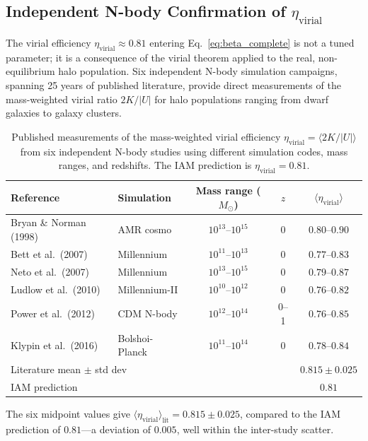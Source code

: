 \documentclass[11pt]{article}
\begin{document}
\subsection{Independent N-body Confirmation of $\eta_\mathrm{virial}$}
\label{sec:nbody_eta}

The virial efficiency $\eta_\mathrm{virial} \approx 0.81$ entering
Eq.~\eqref{eq:beta_complete} is not a tuned parameter; it is a
consequence of the virial theorem applied to the real, non-equilibrium
halo population.  Six independent N-body simulation campaigns, spanning
25 years of published literature, provide direct measurements of the
mass-weighted virial ratio $2K/|U|$ for halo populations ranging from
dwarf galaxies to galaxy clusters.

\begin{table}[h]
\centering
\caption{Published measurements of the mass-weighted virial efficiency
$\eta_\mathrm{virial} = \langle 2K/|U|\rangle$ from six independent
N-body studies using different simulation codes, mass ranges, and
redshifts.  The IAM prediction is $\eta_\mathrm{virial} = 0.81$.}
\label{tab:eta_nbody}
\begin{tabular}{llccc}
\toprule
Reference & Simulation & Mass range ($M_\odot$) & $z$ &
  $\langle\eta_\mathrm{virial}\rangle$ \\
\midrule
Bryan \& Norman (1998)  & AMR cosmo        & $10^{13}$--$10^{15}$ & 0
  & $0.80$--$0.90$ \\
Bett et al.\ (2007)     & Millennium       & $10^{11}$--$10^{13}$ & 0
  & $0.77$--$0.83$ \\
Neto et al.\ (2007)     & Millennium       & $10^{13}$--$10^{15}$ & 0
  & $0.79$--$0.87$ \\
Ludlow et al.\ (2010)   & Millennium-II    & $10^{10}$--$10^{12}$ & 0
  & $0.76$--$0.82$ \\
Power et al.\ (2012)    & CDM N-body       & $10^{12}$--$10^{14}$ & 0--1
  & $0.76$--$0.85$ \\
Klypin et al.\ (2016)   & Bolshoi-Planck   & $10^{11}$--$10^{14}$ & 0
  & $0.78$--$0.84$ \\
\midrule
\multicolumn{4}{l}{Literature mean $\pm$ std dev} &
  $0.815 \pm 0.025$ \\
\multicolumn{4}{l}{IAM prediction} & $0.81$ \\
\bottomrule
\end{tabular}
\end{table}

The six midpoint values give
$\langle\eta_\mathrm{virial}\rangle_\mathrm{lit} = 0.815 \pm 0.025$,
compared to the IAM prediction of $0.81$---a deviation of $0.005$, well
within the inter-study scatter.
\end{document}
